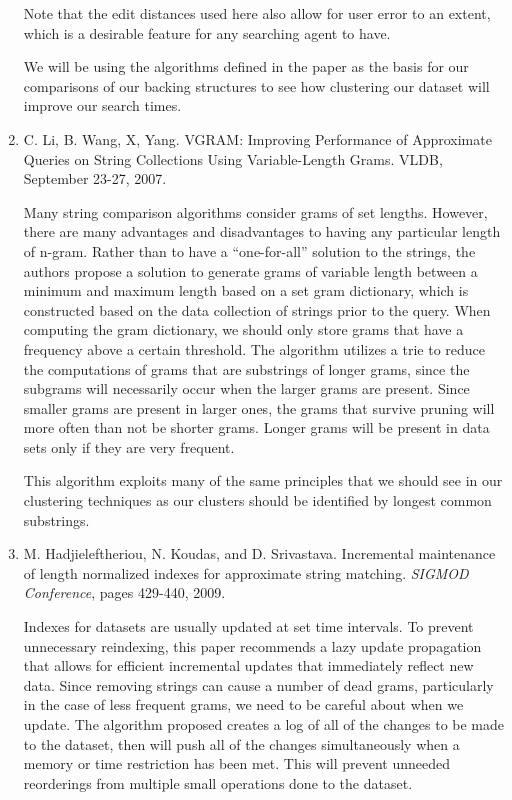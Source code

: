 \documentclass[pdftex,12pt,letter]{article}
\begin{document}
\begin{enumerate}
	Note that the edit distances used here also allow for user error to an extent, which is a desirable feature for any searching agent to have. 

	We will be using the algorithms defined in the paper as the basis for our comparisons of our backing structures to see how clustering our dataset will improve our search times. 

\item C. Li, B. Wang, X, Yang. VGRAM: Improving Performance of Approximate Queries on String Collections Using Variable-Length Grams. VLDB, September 23-27, 2007.

	Many string comparison algorithms consider grams of set lengths. However, there are many advantages and disadvantages to having any particular length of n-gram. Rather than to have a “one-for-all” solution to the strings, the authors propose a solution to generate grams of variable length between a minimum and maximum length based on a set gram dictionary, which is constructed based on the data collection of strings prior to the query. When computing the gram dictionary, we should only store grams that have a frequency above a certain threshold. The algorithm utilizes a trie to reduce the computations of grams that are substrings of longer grams, since the subgrams will necessarily occur when the larger grams are present. Since smaller grams are present in larger ones, the grams that survive pruning will more often than not be shorter grams. Longer grams will be present in data sets only if they are very frequent. 

	This algorithm exploits many of the same principles that we should see in our clustering techniques as our clusters should be identified by longest common substrings. 

\item M. Hadjieleftheriou, N. Koudas, and D. Srivastava. Incremental maintenance of length normalized indexes for approximate string matching. \textit{SIGMOD Conference}, pages 429-440, 2009.

Indexes for datasets are usually updated at set time intervals. To prevent unnecessary reindexing, this paper recommends a lazy update propagation that allows for efficient incremental updates that immediately reflect new data.  Since removing strings can cause a number of dead grams, particularly in the case of less frequent grams, we need to be careful about when we update. The algorithm proposed creates a log of all of the changes to be made to the dataset, then will push all of the changes simultaneously when a memory or time restriction has been met. This will prevent unneeded reorderings from multiple small operations done to the dataset. 


\end{enumerate}
\end{document}
